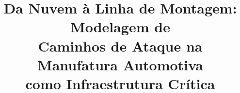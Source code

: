 \documentclass[conference]{IEEEtran}
\begin{document}
\title{Da Nuvem à Linha de Montagem: Modelagem de\\ Caminhos de Ataque na Manufatura Automotiva\\ como Infraestrutura Crítica}

\author{\IEEEauthorblockN{\capmauthor}
}

\maketitle

\begin{abstract}
\capmabstract
\end{abstract}

\begin{IEEEkeywords}
\capmkeywords
\end{IEEEkeywords}





\end{document}
